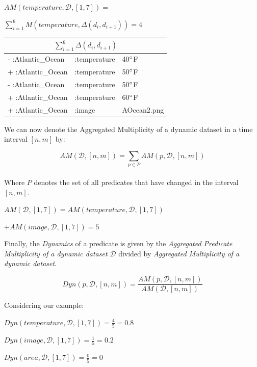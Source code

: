 \documentclass[runningheads]{llncs}
\begin{document}
\begin{example}
	\label{ex:apm}
	$AM(temperature, \mathcal{D},[1, 7]) =$
	
	$ \sum_{i=1}^{6}M(temperature, \Delta(d_i, d_{i+1})) = 4$
	
	\begin{center}    
		\begin{tabular}{lll}    \hline
			\multicolumn{3}{c}{$\sum_{i=1}^{6}\Delta(d_i, d_{i+1})$} \\    \hline
			-    :Atlantic\_Ocean  & :temperature   & 40$\degree$F          \\
			+    :Atlantic\_Ocean  & :temperature   & 50$\degree$F          \\            
			-    :Atlantic\_Ocean  & :temperature   & 50$\degree$F          \\
			+    :Atlantic\_Ocean  & :temperature   & 60$\degree$F          \\
			+    :Atlantic\_Ocean  & :image         & AOcean2.png              \\    \hline
		\end{tabular}
	\end{center}
\end{example}

We can now denote the Aggregated Multiplicity of a dynamic dataset in a time interval $[n,m]$ by:

\begin{equation}
\label{eq:am}
AM(\mathcal{D},[n,m]) = \sum_{p \in P}AM(p, \mathcal{D},[n,m])
\end{equation}\\
Where $ P $ denotes the set of all predicates that have changed in the interval $[n,m]$.

\begin{example}
	\label{ex:am}
	$AM(\mathcal{D},[1,7]) = AM(temperature, \mathcal{D},[1,7])$
	
	$+ AM(image, \mathcal{D},[1,7]) = 5$
\end{example}

Finally, the \textit{Dynamics} of a predicate is given by the \textit{Aggregated Predicate Multiplicity of a dynamic dataset} $\mathcal{D}$ divided by \textit{Aggregated Multiplicity of a dynamic dataset}.

\begin{equation}
\label{eq:dyn}
Dyn(p, \mathcal{D},[n,m]) = \frac{AM(p, \mathcal{D},[n,m])}{AM(\mathcal{D},[n,m])}
\end{equation}

\begin{example}
	\label{ex:dyn}
	Considering our example:
	
	$ Dyn(temperature, \mathcal{D},[1,7]) = \frac{4}{5} = 0.8$
	
	$ Dyn(image, \mathcal{D},[1,7]) = \frac{1}{5} = 0.2$
	
	$ Dyn(area, \mathcal{D},[1,7]) = \frac{0}{5} = 0$
\end{example}
\end{document}

